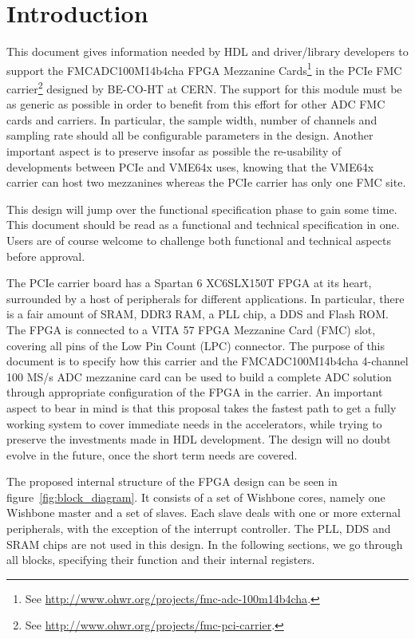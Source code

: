 \documentclass{article}
\begin{document}
\tableofcontents{}
\pagebreak

\section{Introduction}
This document gives information needed by HDL and driver/library developers to support the FMCADC100M14b4cha FPGA Mezzanine Cards\footnote{See \href{http://www.ohwr.org/projects/fmc-adc-100m14b4cha}{http://www.ohwr.org/projects/fmc-adc-100m14b4cha}.} in the PCIe FMC carrier\footnote{See \href{http://www.ohwr.org/projects/fmc-pci-carrier}{http://www.ohwr.org/projects/fmc-pci-carrier}.} designed by BE-CO-HT at CERN. The support for this module must be as generic as possible in order to benefit from this effort for other ADC FMC cards and carriers. In particular, the sample width, number of channels and sampling rate should all be configurable parameters in the design. Another important aspect is to preserve insofar as possible the re-usability of developments between PCIe and VME64x uses, knowing that the VME64x carrier can host two mezzanines whereas the PCIe carrier has only one FMC site.

This design will jump over the functional specification phase to gain some time. This document should be read as a functional and technical specification in one. Users are of course welcome to challenge both functional and technical aspects before approval.

The PCIe carrier board has a Spartan 6 XC6SLX150T FPGA at its heart, surrounded by a host of peripherals for different applications. In particular, there is a fair amount of SRAM, DDR3 RAM, a PLL chip, a DDS and Flash ROM. The FPGA is connected to a VITA 57 FPGA Mezzanine Card (FMC) slot, covering all pins of the Low Pin Count (LPC) connector. The purpose of this document is to specify how this carrier and the FMCADC100M14b4cha 4-channel 100 MS/s ADC mezzanine card can be used to build a complete ADC solution through appropriate configuration of the FPGA in the carrier. An important aspect to bear in mind is that this proposal takes the fastest path to get a fully working system to cover immediate needs in the accelerators, while trying to preserve the investments made in HDL development. The design will no doubt evolve in the future, once the short term needs are covered.

The proposed internal structure of the FPGA design can be seen in figure~\ref{fig:block_diagram}. It consists of a set of Wishbone cores, namely one Wishbone master and a set of slaves. Each slave deals with one or more external peripherals, with the exception of the interrupt controller. The PLL, DDS and SRAM chips are not used in this design. In the following sections, we go through all blocks, specifying their function and their internal registers.
\end{document}
